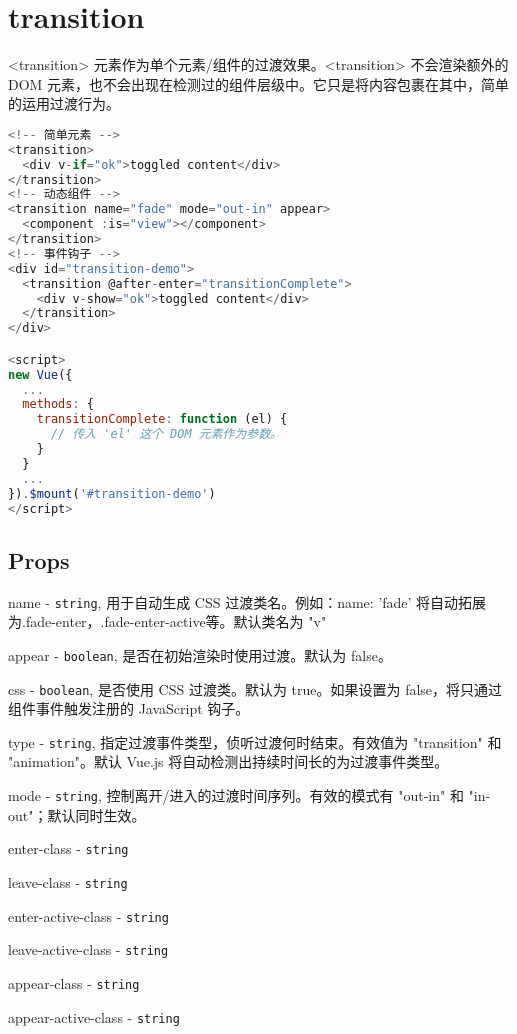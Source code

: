 \begin{lstlisting}[language=JavaScript]

\end{lstlisting}


\section{transition}


<transition> 元素作为单个元素/组件的过渡效果。<transition> 不会渲染额外的 DOM 元素，也不会出现在检测过的组件层级中。它只是将内容包裹在其中，简单的运用过渡行为。

\begin{lstlisting}[language=JavaScript]
<!-- 简单元素 -->
<transition>
  <div v-if="ok">toggled content</div>
</transition>
<!-- 动态组件 -->
<transition name="fade" mode="out-in" appear>
  <component :is="view"></component>
</transition>
<!-- 事件钩子 -->
<div id="transition-demo">
  <transition @after-enter="transitionComplete">
    <div v-show="ok">toggled content</div>
  </transition>
</div>

<script>
new Vue({
  ...
  methods: {
    transitionComplete: function (el) {
      // 传入 'el' 这个 DOM 元素作为参数。
    }
  }
  ...
}).$mount('#transition-demo')
</script>
\end{lstlisting}



\subsection{Props}

\begin{compactitem}
\item name - \texttt{string}, 用于自动生成 CSS 过渡类名。例如：name: 'fade' 将自动拓展为.fade-enter，.fade-enter-active等。默认类名为 "v"
\item appear - \texttt{boolean}, 是否在初始渲染时使用过渡。默认为 false。
\item css - \texttt{boolean}, 是否使用 CSS 过渡类。默认为 true。如果设置为 false，将只通过组件事件触发注册的 JavaScript 钩子。
\item type - \texttt{string}, 指定过渡事件类型，侦听过渡何时结束。有效值为 "transition" 和 "animation"。默认 Vue.js 将自动检测出持续时间长的为过渡事件类型。
\item mode - \texttt{string}, 控制离开/进入的过渡时间序列。有效的模式有 "out-in" 和 "in-out"；默认同时生效。
\item enter-class - \texttt{string}
\item leave-class - \texttt{string}
\item enter-active-class - \texttt{string}
\item leave-active-class - \texttt{string}
\item appear-class - \texttt{string}
\item appear-active-class - \texttt{string}
\end{compactitem}


